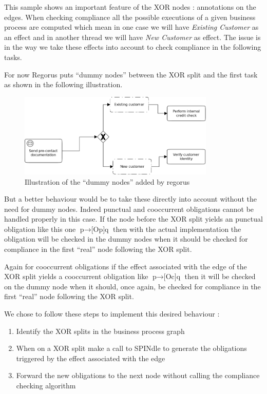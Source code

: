 \documentclass[10pt]{article}
\begin{document}
This sample shows an important feature of the XOR nodes : annotations on the edges. When checking compliance all the possible executions of a given business process are computed which mean in one case we will have \textit{Existing Customer} as an effect and in another thread we will have \textit{New Customer} as effect. The issue is in the way we take these effects into account to check compliance in the following tasks.

For now Regorus puts \enquote{dummy nodes} between the XOR split and the first task as shown in the following illustration.
\begin{figure}[!h] %
\begin{center}
\includegraphics[height=4cm]{XOR2.png} %
\caption{Illustration of the \enquote{dummy nodes} added by regorus} %
\end{center}
\label{image_soleil} %
\end{figure} %

But a better behaviour would be to take these directly into account without the need for dummy nodes. Indeed punctual and cooccurrent obligations cannot be handled properly in this case. If the node before the XOR split yields an punctual obligation like this one $\text{p} \rightarrow \text{[Op]q}$ then with the actual implementation the obligation will be checked in the dummy nodes when it should be checked for compliance in the first \enquote{real} node following the XOR split.

Again for cooccurrent obligations if the effect associated with the edge of the XOR split yields a cooccurrent obligation like $\text{p} \rightarrow \text{[Oc]q}$ then it will be checked on the dummy node when it should, once again, be checked for compliance in the first \enquote{real} node following the XOR split.

We chose to follow these steps to implement this desired behaviour :
\begin{enumerate}
\item Identify the XOR splits in the business process graph
\item When on a XOR split make a call to SPINdle to generate the obligations triggered by the effect associated with the edge
\item Forward the new obligations to the next node without calling the compliance checking algorithm
\end{enumerate}
\end{document}
